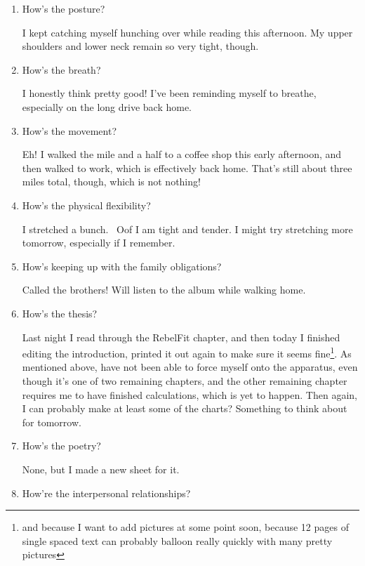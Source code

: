 \documentclass[12pt]{article}
\renewcommand{\,}{\textsuperscript{,}}
\begin{document}
\begin{enumerate}
Since then I've had an espresso tonic, a peppermint French soda, some tea, and will be eating a polish sausage\footnote{maxwell street brand}

\item How's the posture?

I kept catching myself hunching over while reading this afternoon.  
My upper shoulders and lower neck remain so very tight, though.

\item How's the breath?

I honestly think pretty good! I've been reminding myself to breathe, especially on the long drive back home.

\item How's the movement?

Eh! I walked the mile and a half to a coffee shop this early afternoon, and then walked to work, which is effectively back home.  
That's still about three miles total, though, which is not nothing!

\item How's the physical flexibility?

I stretched a bunch.   
Oof I am tight and tender.  
I might try stretching more tomorrow, especially if I remember.

\item How's keeping up with the family obligations?

Called the brothers! Will listen to the album while walking home.

\item How's the thesis?

Last night I read through the RebelFit chapter, and then today I finished editing the introduction, printed it out again to make sure it seems fine\footnote{and because I want to add pictures at some point soon, because 12 pages of single spaced text can probably balloon really quickly with many pretty pictures}.  
As mentioned above, have not been able to force myself onto the apparatus, even though it's one of two remaining chapters, and the other remaining chapter requires me to have finished calculations, which is yet to happen.  
Then again, I can probably make at least some of the charts? Something to think about for tomorrow.

\item How's the poetry?

None, but I made a new sheet for it.

\item How're the interpersonal relationships?


\end{enumerate}
\end{document}
